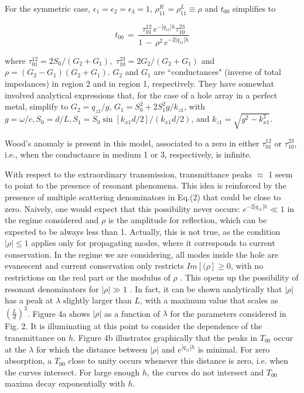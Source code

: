 For the symmetric case, 
$\epsilon_1 = \epsilon_2=\epsilon_3=1$, 
$\rho^R_{11} = \rho^L_{11}\equiv\rho$ and 
$t_{00}$ simplifies to

\begin{equation}
t_{00} \, = \, \frac{\tau^{12}_{01}\,e^{-|q_{z1}|h} \tau^{23}_{10}}{ 1 \, -
\, \rho^2 \, e^{-2|q_{z1}|h}}
\end{equation}

where $\tau^{12}_{01} = 2 S_0/(G_2 + G_1),\,\, \tau^{23}_{10} = 2
G_2/(G_2 + G_1)$ and $\rho = (G_2 - G_1)(G_2 + G_1)$.
$G_2$ and $G_1$ are ``conductances" (inverse of total impedances) 
in region 2 and in region 1, 
respectively. They have somewhat involved analytical 
expressions that, for the case
of a hole array in a perfect metal, simplify to 
$G_2 = q_{z1}/g , \, G_1 = S_0^2 + 2 S_1^2 g/k_{z1}$, 
with $g=\omega/c, S_0=d/L,
S_1 = S_0 \sin\left[k_{x1} d/2\right]/(k_{x1} d/2)$, and 
$k_{z1} = \sqrt{g^2-k_{x1}^2}$.
 
Wood's anomaly is present in this model,  
associated to a zero in either $\tau^{12}_{01}$ or
$\tau^{23}_{10}$, i.e., when the conductance in medium 1 or 3, respectively,
is infinite.  

With respect to the extraordinary transmission, 
transmittance peaks $\approx$ 1 seem to point to the presence of resonant
phenomena. This idea is reinforced by the presence of multiple scattering
denominators in Eq.(2) that could be close to zero. Naively, one would expect
that this possibility never occurs: $e^{-2|q_{z1}|h} \ll 1$ in the regime
considered and $\rho$ is the amplitude for reflection, which can be expected
to be always less than 1. Actually, this is not true, as the condition $
|\rho | \le 1$ applies only for propagating modes, where it corresponds to
current conservation. In the regime we are considering, all modes inside the
hole are evanescent and current conservation only restricts 
$Im\left[(\rho\right] \ge 0$,
with no restrictions on the real part or the modulus of $\rho$
. This opens up the possibility of resonant denominators for $|\rho | \gg 1$
. In fact, it can be shown analytically that $|\rho |$ has a peak at
$\lambda$ slightly larger than $L$, with a maximum value that scales as $(
\frac{L}{d})^3$. Figure 4a shows $|\rho |$ as a function of $\lambda$ for
the parameters considered in Fig. 2. 
It is illuminating at this point to consider the dependence of the
transmittance on $h$. Figure 4b illustrates graphically 
that the peaks in $T_{00}$ 
occur at the $\lambda$ for which the distance between $|\rho|$
and $e^{|q_{z1}| h}$ is minimal. 
For zero absorption, a $T_{00} $ close to unity occurs whenever
this distance is zero, 
i.e. when the curves intersect. For large enough $h$, the
curves do not intersect and $T_{00}$ maxima 
decay exponentially with $h$.

